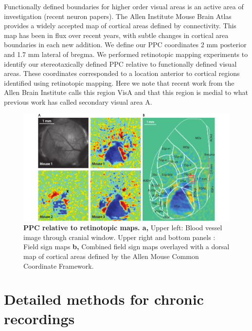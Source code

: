 \bigskip

Functionally defined boundaries for higher order visual areas is an active area of investigation (recent neuron papers). The Allen Institute Mouse Brain Atlas provides a widely accepted map of cortical areas defined by connectivity. This map has been in flux over recent years, with subtle changes in cortical area boundaries in each new addition. We define our PPC coordinates 2 mm posterior and 1.7 mm lateral of bregma. We performed retinotopic mapping experiments to identify our stereotaxically defined PPC relative to functionally defined visual areas. These coordinates corresponded to a location anterior to cortical regions identified using retinotopic mapping. Here we note that recent work from the Allen Brain Institute calls this region VisA and that this region is medial to what previous work has called secondary visual area A.

\begin{figure}
\includegraphics[width=\textwidth]{figures/widefield.pdf}
\caption[PPC relative to retinotopic maps]{\textbf{PPC relative to retinotopic maps. a,} Upper left: Blood vessel image through cranial window. Upper right and bottom panels : Field sign maps
%
\textbf{b,} Combined field sign maps overlayed with a dorsal map of cortical areas defined by the Allen Mouse Common Coordinate Framework.
\label{fig:widefield}}
\end{figure}

\section{Detailed methods for chronic recordings}

